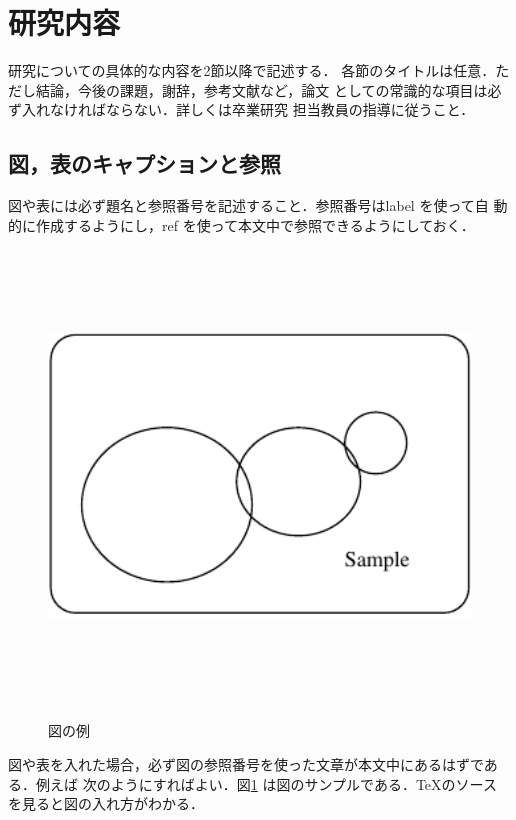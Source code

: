 \section{研究内容}\label{sec3}
研究についての具体的な内容を2節以降で記述する．
各節のタイトルは任意．ただし結論，今後の課題，謝辞，参考文献など，論文
としての常識的な項目は必ず入れなければならない．詳しくは卒業研究
担当教員の指導に従うこと．


\subsection{図，表のキャプションと参照}

図や表には必ず題名と参照番号を記述すること．参照番号はlabel を使って自
動的に作成するようにし，ref を使って本文中で参照できるようにしておく．

\begin{figure}[htbp]
  \begin{center}
     \includegraphics[width=13cm,height=12cm,keepaspectratio]{figure.pdf}\\
  \end{center}
  \caption{図の例}%
\label{fig1}
\end{figure}

図や表を入れた場合，必ず図の参照番号を使った文章が本文中にあるはずである．例えば
次のようにすればよい．図\ref{fig1} は図のサンプルである．\TeX のソース
を見ると図の入れ方がわかる．

